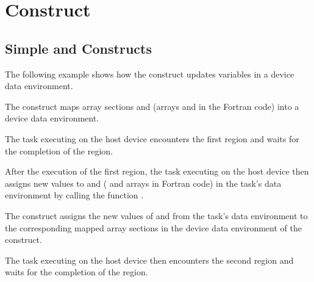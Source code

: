 \section{ Construct}
\label{sec:target_update}

\subsection{Simple  and  Constructs}
\label{subsec:target_data_and_update}

The following example shows how the  construct updates 
variables in a device data environment.

The  construct maps array sections  and  
(arrays  and  in the Fortran code) into a device data environment.

The task executing on the host device encounters the first  region 
and waits for the completion of the region.

After the execution of the first  region, the task executing on 
the host device then assigns new values to  and  ( and  arrays 
in Fortran code) in the task's data environment by calling the function .

The  construct assigns the new values of  and 
 from the task's data environment to the corresponding mapped array sections 
in the device data environment of the  construct.

The task executing on the host device then encounters the second  
region and waits for the completion of the region.

